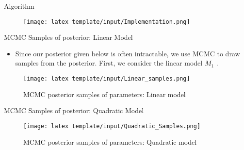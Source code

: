 \documentclass[t, aspectratio=169]{beamer}
\begin{document}

\begin{frame}{Algorithm}

 \begin{figure}
 \centering
 \texttt{[image: latex template/input/Implementation.png]}
 
 \end{figure}
\end{frame}


\begin{frame}{MCMC Samples of posterior: Linear Model}
\begin{itemize}
    \item Since our posterior given below is often intractable, we use MCMC to draw samples from the posterior. First, we consider the linear model \(M_1\) .
\end{itemize}
\vspace{0.1cm}
 \begin{figure}
 \centering
 \texttt{[image: latex template/input/Linear\_samples.png]}
 \caption{MCMC posterior samples of parameters: Linear model}
 
 \end{figure}
\end{frame}


\begin{frame}{MCMC Samples of posterior: Quadratic Model}

 \begin{figure}
 \centering
 \texttt{[image: latex template/input/Quadratic\_Samples.png]}
 \caption{MCMC posterior samples of parameters: Quadratic model}
 \end{figure}
\end{frame}


\end{document}
